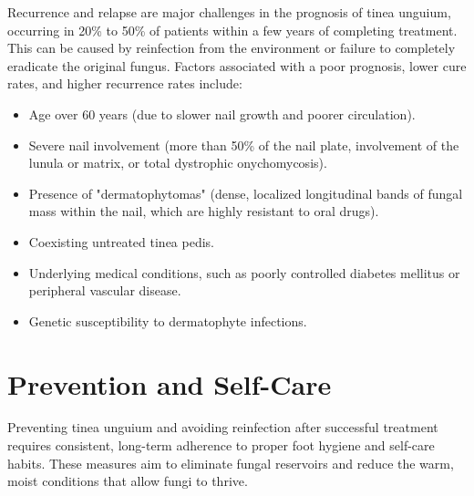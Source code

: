 Recurrence and relapse are major challenges in the prognosis of tinea unguium, occurring in 20\% to 50\% of patients within a few years of completing treatment. This can be caused by reinfection from the environment or failure to completely eradicate the original fungus. Factors associated with a poor prognosis, lower cure rates, and higher recurrence rates include:
\begin{itemize}
    \item Age over 60 years (due to slower nail growth and poorer circulation).
    \item Severe nail involvement (more than 50\% of the nail plate, involvement of the lunula or matrix, or total dystrophic onychomycosis).
    \item Presence of "dermatophytomas" (dense, localized longitudinal bands of fungal mass within the nail, which are highly resistant to oral drugs).
    \item Coexisting untreated tinea pedis.
    \item Underlying medical conditions, such as poorly controlled diabetes mellitus or peripheral vascular disease.
    \item Genetic susceptibility to dermatophyte infections.
\end{itemize}

\section*{Prevention and Self-Care}
Preventing tinea unguium and avoiding reinfection after successful treatment requires consistent, long-term adherence to proper foot hygiene and self-care habits. These measures aim to eliminate fungal reservoirs and reduce the warm, moist conditions that allow fungi to thrive.

